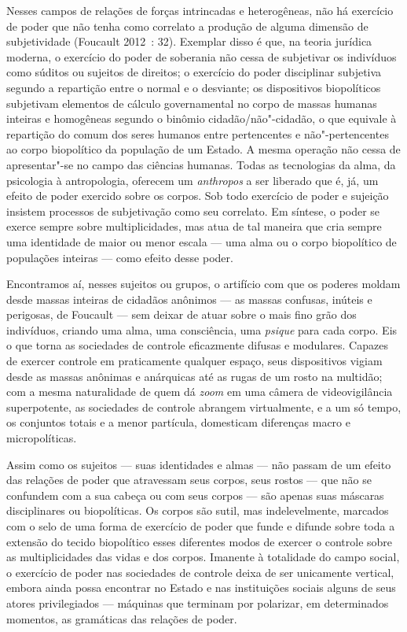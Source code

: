 Nesses campos de relações de forças intrincadas e heterogêneas, não há
exercício de poder que não tenha como correlato a produção de alguma
dimensão de subjetividade (Foucault 2012~: 32). Exemplar disso é que, na
teoria jurídica moderna, o exercício do poder de soberania não cessa de
subjetivar os indivíduos como súditos ou sujeitos de direitos; o
exercício do poder disciplinar subjetiva segundo a repartição entre o
normal e o desviante; os dispositivos biopolíticos subjetivam elementos
de cálculo governamental no corpo de massas humanas inteiras e
homogêneas segundo o binômio cidadão/não"-cidadão, o que equivale à
repartição do comum dos seres humanos entre pertencentes e
não"-pertencentes ao corpo biopolítico da população de um Estado. A mesma
operação não cessa de apresentar"-se no campo das ciências humanas. Todas
as tecnologias da alma, da psicologia à antropologia, oferecem um
\emph{anthropos} a ser liberado que é, já, um efeito de poder exercido
sobre os corpos. Sob todo exercício de poder e sujeição insistem
processos de subjetivação como seu correlato. Em síntese, o poder se
exerce sempre sobre multiplicidades, mas atua de tal maneira que cria
sempre uma identidade de maior ou menor escala --- uma alma ou o corpo
biopolítico de populações inteiras --- como efeito desse poder.

Encontramos aí, nesses sujeitos ou grupos, o artifício com que os
poderes moldam desde massas inteiras de cidadãos anônimos --- as massas
confusas, inúteis e perigosas, de Foucault --- sem deixar de atuar sobre
o mais fino grão dos indivíduos, criando uma alma, uma consciência, uma
\emph{psique} para cada corpo. Eis o que torna as sociedades de controle
eficazmente difusas e modulares. Capazes de exercer controle em
praticamente qualquer espaço, seus dispositivos vigiam desde as massas
anônimas e anárquicas até as rugas de um rosto na multidão; com a mesma
naturalidade de quem dá \emph{zoom} em uma câmera de videovigilância
superpotente, as sociedades de controle abrangem virtualmente, e a um só
tempo, os conjuntos totais e a menor partícula, domesticam diferenças
macro e micropolíticas.

Assim como os sujeitos --- suas identidades e almas --- não passam de um
efeito das relações de poder que atravessam seus corpos, seus rostos ---
que não se confundem com a sua cabeça ou com seus corpos --- são apenas
suas máscaras disciplinares ou biopolíticas. Os corpos são sutil, mas
indelevelmente, marcados com o selo de uma forma de exercício de poder
que funde e difunde sobre toda a extensão do tecido biopolítico esses
diferentes modos de exercer o controle sobre as multiplicidades das
vidas e dos corpos. Imanente à totalidade do campo social, o exercício
de poder nas sociedades de controle deixa de ser unicamente vertical,
embora ainda possa encontrar no Estado e nas instituições sociais alguns
de seus atores privilegiados --- máquinas que terminam por polarizar, em
determinados momentos, as gramáticas das relações de poder.

